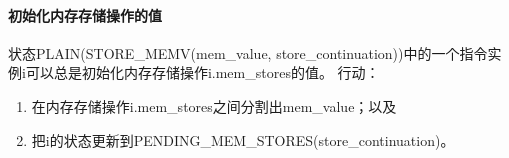 \paragraph{初始化内存存储操作的值}\label{omm:instantiate_store_value}
状态PLAIN(STORE_MEMV(mem_value, store_continuation))中的一个指令实例i可以总是初始化内存存储操作i.mem_stores的值。
行动：
\begin{enumerate}
\item 在内存存储操作i.mem_stores之间分割出mem_value；以及 %
\item 把i的状态更新到PENDING_MEM_STORES(store_continuation)。 %
\end{enumerate}


